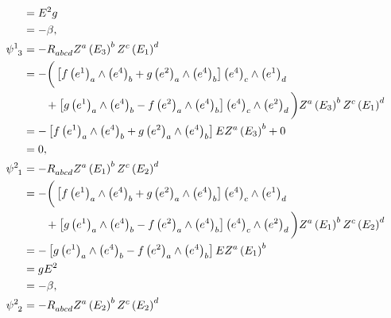\begin{xiti}
\begin{zm}
\begin{align*}
			&= E^2 g\\
			&= - \beta,\\
			\tensor{\psi}{^1_3} &= - \tensor{R}{_a_b_c_d} \tensor{Z}{^a} \tensor{\left( E_3 \right)}{^b} \tensor{Z}{^c} \tensor{\left( E_1 \right)}{^d}\\
			&= - \bigg( \left[ f \tensor{\left( e^1 \right)}{_a} \wedge \tensor{\left( e^4 \right)}{_b} + g \tensor{\left( e^2 \right)}{_a} \wedge \tensor{\left( e^4 \right)}{_b} \right] \tensor{\left( e^4 \right)}{_c} \wedge \tensor{\left( e^1 \right)}{_d}\\
			&\qquad {}+ \left[ g \tensor{\left( e^1 \right)}{_a} \wedge \tensor{\left( e^4 \right)}{_b} - f \tensor{\left( e^2 \right)}{_a} \wedge \tensor{\left( e^4 \right)}{_b} \right] \tensor{\left( e^4 \right)}{_c} \wedge \tensor{\left( e^2 \right)}{_d} \bigg) \tensor{Z}{^a} \tensor{\left( E_3 \right)}{^b} \tensor{Z}{^c} \tensor{\left( E_1 \right)}{^d}\\
			&= - \left[ f \tensor{\left( e^1 \right)}{_a} \wedge \tensor{\left( e^4 \right)}{_b} + g \tensor{\left( e^2 \right)}{_a} \wedge \tensor{\left( e^4 \right)}{_b} \right] E \tensor{Z}{^a} \tensor{\left( E_3 \right)}{^b} + 0 \\
			&= 0,\\
			\tensor{\psi}{^2_1} &= - \tensor{R}{_a_b_c_d} \tensor{Z}{^a} \tensor{\left( E_1 \right)}{^b} \tensor{Z}{^c} \tensor{\left( E_2 \right)}{^d}\\
			&= - \bigg( \left[ f \tensor{\left( e^1 \right)}{_a} \wedge \tensor{\left( e^4 \right)}{_b} + g \tensor{\left( e^2 \right)}{_a} \wedge \tensor{\left( e^4 \right)}{_b} \right] \tensor{\left( e^4 \right)}{_c} \wedge \tensor{\left( e^1 \right)}{_d}\\
			&\qquad {}+ \left[ g \tensor{\left( e^1 \right)}{_a} \wedge \tensor{\left( e^4 \right)}{_b} - f \tensor{\left( e^2 \right)}{_a} \wedge \tensor{\left( e^4 \right)}{_b} \right] \tensor{\left( e^4 \right)}{_c} \wedge \tensor{\left( e^2 \right)}{_d} \bigg) \tensor{Z}{^a} \tensor{\left( E_1 \right)}{^b} \tensor{Z}{^c} \tensor{\left( E_2 \right)}{^d}\\
			&= - \left[ g \tensor{\left( e^1 \right)}{_a} \wedge \tensor{\left( e^4 \right)}{_b} - f \tensor{\left( e^2 \right)}{_a} \wedge \tensor{\left( e^4 \right)}{_b} \right] E \tensor{Z}{^a} \tensor{\left( E_1 \right)}{^b}\\
			&= g E^2\\
			&= - \beta,\\
			\tensor{\psi}{^2_2} &= - \tensor{R}{_a_b_c_d} \tensor{Z}{^a} \tensor{\left( E_2 \right)}{^b} \tensor{Z}{^c} \tensor{\left( E_2 \right)}{^d}\\

\end{align*}
\end{zm}
\end{xiti}

